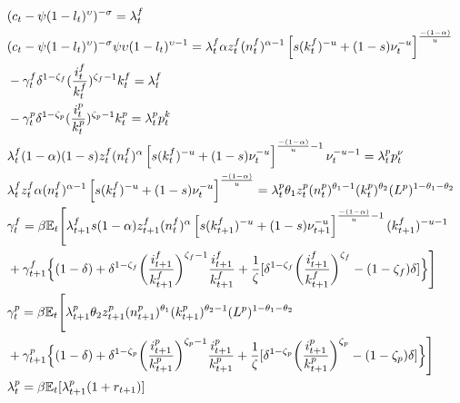 \documentclass[11pt,a4paper]{article}
\numberwithin{equation}{section}
\theoremstyle{definition}
\begin{document}
\begin{align}
& (c_{t}-\psi(1-l_{t})^{\upsilon})^{-\sigma}=\lambda^{f}_{t} \\
& (c_{t}-\psi(1-l_{t})^{\upsilon})^{-\sigma}\psi\upsilon(1-l_{t})^{\upsilon-1}=\lambda^{f}_{t}\alpha z_{t}^{f}(n^{f}_{t})^{\alpha-1}\left[s(k^{f}_{t})^{-u}+(1-s)\nu_{t}^{-u}\right]^{\frac{-(1-\alpha)}{u}} \\
& -\gamma^{f}_{t}\delta^{1-\zeta_{f}}(\frac{i_{t}^{f}}{k^{f}_{t}})^{\zeta_{f}-1}k^{f}_{t}=\lambda^{f}_{t} \\
& -\gamma^{p}_{t}\delta^{1-\zeta_{p}}(\frac{i_{t}^{p}}{k^{p}_{t}})^{\zeta_{p}-1}k_{t}^{p}=\lambda^{p}_{t}p_{t}^{k} \\
& \lambda^{f}_{t}(1-\alpha)(1-s)z^{f}_{t}(n^{f}_{t})^{\alpha}\left[s(k^{f}_{t})^{-u}+(1-s)\nu_{t}^{-u}\right]^{\frac{-(1-\alpha)}{u}-1}\nu_{t}^{-u-1}=\lambda^{p}_{t}p^{\nu}_{t} \\
& \lambda^{f}_{t}z^{f}_{t}\alpha(n^{f}_{t})^{\alpha-1}\left[s(k^{f}_{t})^{-u}+(1-s)\nu_{t}^{-u}\right]^{\frac{-(1-\alpha)}{u}}=\lambda^{p}_{t}\theta_{1}z^{p}_{t}(n_{t}^{p})^{\theta_{1}-1}(k_{t}^{p})^{\theta_{2}}(L^{p})^{1-\theta_{1}-\theta_{2}} \\
& \gamma^{f}_{t}=\beta\mathbb{E}_{t}\Biggl[\lambda^{f}_{t+1}s(1-\alpha)z^{f}_{t+1}(n^{f}_{t})^{\alpha}\left[s(k^{f}_{t+1})^{-u}+(1-s)\nu_{t+1}^{-u}\right]^{\frac{-(1-\alpha)}{u}-1}(k^{f}_{t+1})^{-u-1} \nonumber \\
& +\gamma^{f}_{t+1}\Bigl\{(1-\delta)+\delta^{1-\zeta_{f}}\biggl(\frac{i_{t+1}^{f}}{k^{f}_{t+1}}\biggr)^{\zeta_{f}-1}\frac{i^{f}_{t+1}}{k^{f}_{t+1}}+\frac{1}{\zeta}[\delta^{1-\zeta_{f}}\biggl(\frac{i_{t+1}^{f}}{k^{f}_{t+1}}\biggr)^{\zeta_{f}}-(1-\zeta_{f})\delta]\Bigr\}\Biggr] \\
& \gamma^{p}_{t}=\beta\mathbb{E}_{t}\Biggl[\lambda^{p}_{t+1}\theta_{2}z^{p}_{t+1}(n_{t+1}^{p})^{\theta_{1}}(k^{p}_{t+1})^{\theta_{2}-1}(L^{p})^{1-\theta_{1}-\theta_{2}} \nonumber \\
& +\gamma^{p}_{t+1}\Bigl\{(1-\delta)+\delta^{1-\zeta_{p}}\biggl(\frac{i_{t+1}^{p}}{k^{p}_{t+1}}\biggr)^{\zeta_{p}-1}\frac{i^{p}_{t+1}}{k^{p}_{t+1}}+\frac{1}{\zeta}[\delta^{1-\zeta_{p}}\biggl(\frac{i_{t+1}^{p}}{k^{p}_{t+1}}\biggr)^{\zeta_{p}}-(1-\zeta_{p})\delta]\Bigr\}\Biggr] \\
& \lambda^{p}_{t}=\beta\mathbb{E}_{t}[\lambda^{p}_{t+1}(1+r_{t+1})]
\end{align}


\end{document}
